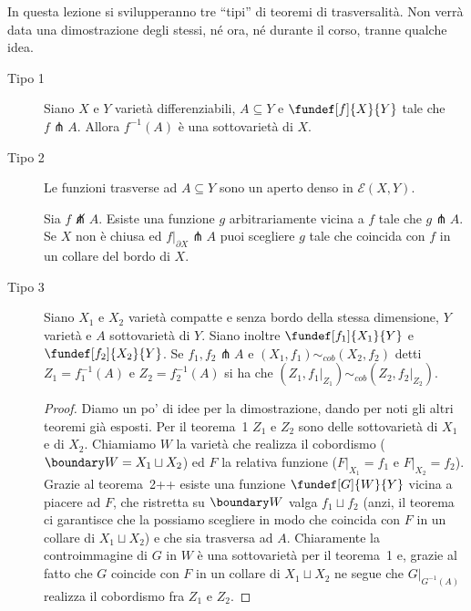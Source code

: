 
In questa lezione si svilupperanno tre ``tipi'' di teoremi di trasversalità. Non verrà data una dimostrazione degli stessi, né ora, né durante il corso, tranne qualche idea.

\begin{description}
\item [Tipo 1] %
\begin{teo}[Teorema 1]
Siano $X$ e $Y$ varietà differenziabili, $A\subseteq Y$ e $\fundef[f]{X}{Y}$  tale che $f\pitchfork A$. Allora $f^{-1}(A)$ è una sottovarietà di $X$.
\end{teo}
\item [Tipo 2] %
\begin{teo}[Teorema 2]
Le funzioni trasverse ad $A\subseteq Y$ sono un aperto denso in $\mathcal E(X,Y)$.
\end{teo}
\begin{teo}[Teorema 2++] \footnotemark %
Sia $f \not\pitchfork A$. Esiste una funzione $g$ arbitrariamente vicina a $f$ tale che $g\pitchfork A$. Se $X$ non è chiusa ed $f|_{\partial X} \pitchfork A$ puoi scegliere $g$ tale che coincida con $f$ in un collare del bordo di $X$.
\end{teo}
\item [Tipo 3] %
\begin{teo}[Teorema 3]
Siano $X_1$ e $X_2$ varietà compatte e senza bordo della stessa dimensione, $Y$ varietà e $A$ sottovarietà di $Y$. Siano inoltre $\fundef[f_1]{X_1}{Y}$ e $\fundef[f_2]{X_2}{Y}$. Se $f_1, f_2 \pitchfork A$ e $(X_1,f_1) \sim_{cob} (X_2,f_2)$ detti $Z_1=f_1^{-1}(A)$ e $Z_2=f_2^{-1}(A)$ si ha che $(Z_1, f_1|_{Z_1}) \sim_{cob} (Z_2,f_2|_{Z_2})$.
\end{teo}
\begin{proof}
 Diamo un po' di idee per la dimostrazione, dando per noti gli altri teoremi già esposti. Per il teorema~1 $Z_1$ e $Z_2$ sono delle sottovarietà di $X_1$ e di $X_2$. Chiamiamo $W$ la varietà che realizza il cobordismo ($\boundary W = X_1 \sqcup X_2$) ed $F$ la relativa funzione ($F|_{X_1} = f_1$ e $F|_{X_2}=f_2$). Grazie al teorema~2++ esiste una funzione $\fundef[G]{W}{Y}$ vicina a piacere ad $F$, che ristretta su $\boundary W$ valga $f_1\sqcup f_2$ (anzi, il teorema ci garantisce che la possiamo scegliere in modo che coincida con $F$ in un collare di $X_1\sqcup X_2$) e che sia trasversa ad $A$. Chiaramente la controimmagine di $G$ in $W$ è una sottovarietà per il teorema~1 e, grazie al fatto che $G$ coincide con $F$ in un collare di $X_1 \sqcup X_2$ ne segue che $G|_{G^{-1}(A)}$ realizza il cobordismo fra $Z_1$ e $Z_2$.

\end{proof}
\end{description}
